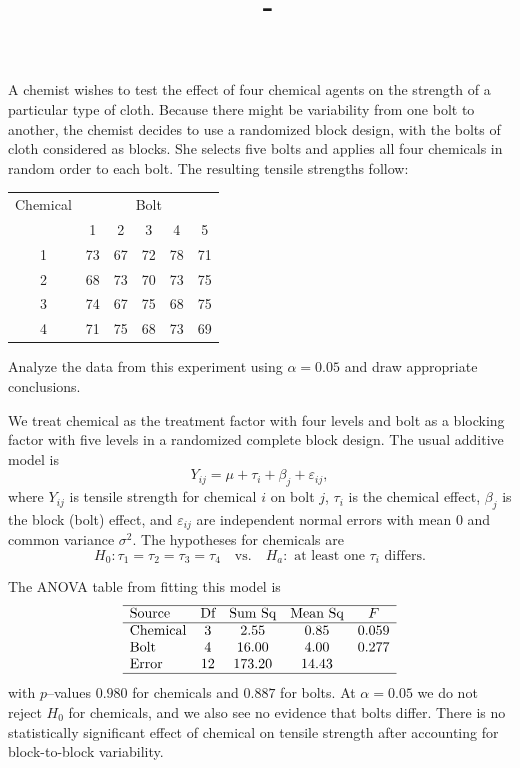 \documentclass[answers,12pt,addpoints]{exam}
\author{\name}
\title{\course \ - \assignment}
\begin{document}
\maketitle

\begin{questions}
 A chemist wishes to test the effect of four chemical agents on the strength of a particular type of cloth. Because there might be variability from one bolt to another, the chemist decides to use a randomized block design, with the bolts of cloth considered as blocks. She selects five bolts and applies all four chemicals in random order to each bolt. The resulting tensile strengths follow:

\begin{center}
\begin{tabular}{c|ccccc}
\hline
Chemical & \multicolumn{5}{c}{Bolt} \\
        & 1 & 2 & 3 & 4 & 5 \\
\hline
1 & 73 & 67 & 72 & 78 & 71 \\
2 & 68 & 73 & 70 & 73 & 75 \\
3 & 74 & 67 & 75 & 68 & 75 \\
4 & 71 & 75 & 68 & 73 & 69 \\
\hline
\end{tabular}
\end{center}

Analyze the data from this experiment using $\alpha = 0.05$ and draw appropriate conclusions.

\begin{solution}
We treat chemical as the treatment factor with four levels and bolt as a blocking factor with five levels in a randomized complete block design. The usual additive model is
\[
Y_{ij} = \mu + \tau_i + \beta_j + \varepsilon_{ij},
\]
where $Y_{ij}$ is tensile strength for chemical $i$ on bolt $j$, $\tau_i$ is the chemical effect, $\beta_j$ is the block (bolt) effect, and $\varepsilon_{ij}$ are independent normal errors with mean $0$ and common variance $\sigma^2$. The hypotheses for chemicals are
\[
H_0: \tau_1 = \tau_2 = \tau_3 = \tau_4 \quad\text{vs.}\quad H_a:\text{ at least one }\tau_i\text{ differs}.
\]

The ANOVA table from fitting this model is
\[
\begin{array}{lcccc}
\hline
\text{Source} & \text{Df} & \text{Sum Sq} & \text{Mean Sq} & F \\
\hline
\text{Chemical} & 3 & 2.55 & 0.85 & 0.059 \\
\text{Bolt} & 4 & 16.00 & 4.00 & 0.277 \\
\text{Error} & 12 & 173.20 & 14.43 & \\
\hline
\end{array}
\]
with $p$–values $0.980$ for chemicals and $0.887$ for bolts. At $\alpha = 0.05$ we do not reject $H_0$ for chemicals, and we also see no evidence that bolts differ. There is no statistically significant effect of chemical on tensile strength after accounting for block-to-block variability.


\end{solution}
\end{questions}
\end{document}
